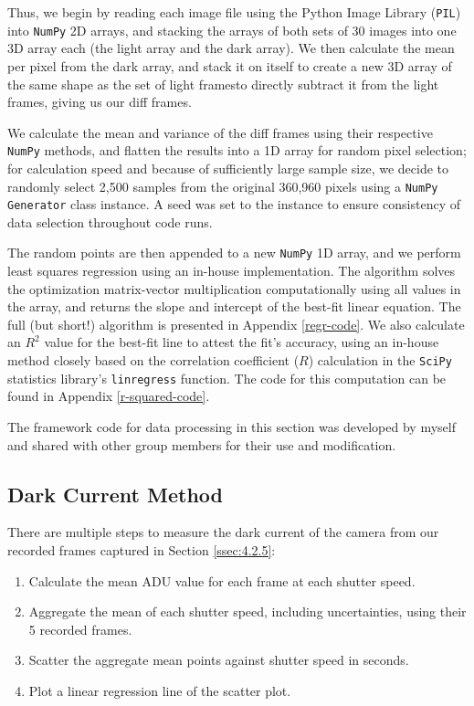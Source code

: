 \documentclass[preprint2]{aastex702}
\begin{document}
			Thus, we begin by reading each image file using the Python Image Library (\texttt{PIL}) into \texttt{NumPy} 2D arrays, and stacking the arrays of both sets of 30 images into one 3D array each (the light array and the dark array). We then calculate the mean per pixel from the dark array, and stack it on itself to create a new 3D array of the same shape as the set of light framesto directly subtract it from the light frames, giving us our diff frames. 

			We calculate the mean and variance of the diff frames using their respective \texttt{NumPy} methods, and flatten the results into a 1D array for random pixel selection; for calculation speed and because of sufficiently large sample size, we decide to randomly select 2,500 samples from the original 360,960 pixels using a \texttt{NumPy Generator} class instance. A seed was set to the instance to ensure consistency of data selection throughout code runs.

			The random points are then appended to a new \texttt{NumPy} 1D array, and we perform least squares regression using an in-house implementation. The algorithm solves the optimization matrix-vector multiplication computationally using all values in the array, and returns the slope and intercept of the best-fit linear equation. The full (but short!) algorithm is presented in Appendix \ref{regr-code}. We also calculate an $R^2$ value for the best-fit line to attest the fit's accuracy, using an in-house method closely based on the correlation coefficient ($R$) calculation in the \texttt{SciPy} statistics library's \texttt{linregress} function. The code for this computation can be found in Appendix \ref{r-squared-code}.

			The framework code for data processing in this section was developed by myself and shared with other group members for their use and modification.

		\subsection{Dark Current Method}\label{ssec:4.2.5-meth}

			There are multiple steps to measure the dark current of the camera from our recorded frames captured in Section \ref{ssec:4.2.5}:

			\begin{enumerate}
				\itemsep=0em
				\item Calculate the mean ADU value for each frame at each shutter speed.
				\item Aggregate the mean of each shutter speed, including uncertainties, using their 5 recorded frames.
				\item Scatter the aggregate mean points against shutter speed in seconds.
				\item Plot a linear regression line of the scatter plot.
			\end{enumerate}
\end{document}
